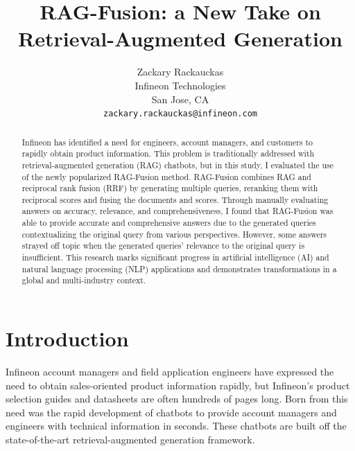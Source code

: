 \documentclass{article}
\title{RAG-Fusion: a New Take on Retrieval-Augmented Generation
}
\author{
  Zackary Rackauckas \\
  Infineon Technologies \\
  San Jose, CA\\
  \texttt{zackary.rackauckas@infineon.com} \\
}
\begin{document}
\maketitle

\begin{abstract}
Infineon has identified a need for engineers, account managers, and customers to rapidly obtain product information. This problem is traditionally addressed with retrieval-augmented generation (RAG) chatbots, but in this study, I evaluated the use of the newly popularized RAG-Fusion method. RAG-Fusion combines RAG and reciprocal rank fusion (RRF) by generating multiple queries, reranking them with reciprocal scores and fusing the documents and scores. Through manually evaluating answers on accuracy, relevance, and comprehensiveness, I found that RAG-Fusion was able to provide accurate and comprehensive answers due to the generated queries contextualizing the original query from various perspectives. However, some answers strayed off topic when the generated queries' relevance to the original query is insufficient. This research marks significant progress in artificial intelligence (AI) and natural language processing (NLP) applications and demonstrates transformations in a global and multi-industry context.
\end{abstract}



\section*{Introduction}
Infineon account managers and field application engineers have expressed the need to obtain sales-oriented product information rapidly, but Infineon's product selection guides and datasheets are often hundreds of pages long. Born from this need was the rapid development of chatbots to provide account managers and engineers with technical information in seconds. These chatbots are built off the state-of-the-art retrieval-augmented generation framework.
\end{document}
